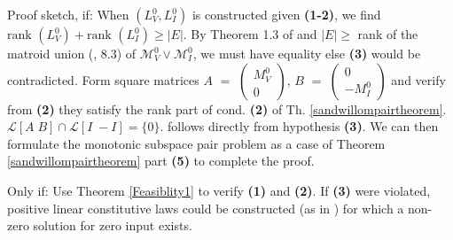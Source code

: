 \documentclass{article}
\newcommand{\hmat}[2]{[#1\;#2]}
\begin{document}
Proof sketch, if:  When $(L_V^0,L_I^0)$ is constructed given
\textbf{(1-2)}, we find $\mbox{rank\ }(L_V^0)+\mbox{rank\ }(L_I^0)\geq|E|$. By
Theorem 1.3 of \cite{sdcOMP}
and $|E|\geq$ rank of the matroid union 
(\cite{Welsh}, 8.3) of $\mathcal{M}_V^0\vee\mathcal{M}_I^0$,
we must have equality else \textbf{(3)} would be 
contradicted.  
Form square matrices
$A$ $=$ $\left(\begin{array}{c}M_V^0\\ 0\end{array}\right)$,
$B$ $=$ $\left(\begin{array}{c}0\\ -M_I^0\end{array}\right)$ and 
verify from \textbf{(2)} they satisfy the rank part of cond. \textbf{(2)} of
Th. \ref{sandwillompairtheorem}. 
${\mathcal L}\hmat{A}{B} \cap {\mathcal L}\hmat{I}{-I}=\{0\}.$
follows directly from hypothesis \textbf{(3)}.  We can then
formulate the monotonic 
subspace pair problem as a case of 
Theorem \ref{sandwillompairtheorem} part \textbf{(5)} to complete the proof.

Only if:  Use Theorem \ref{Feasiblity1} to verify \textbf{(1)} and 
\textbf{(2)}.  
If \textbf{(3)} were violated,
positive linear constitutive laws could be constructed
(as in \cite{HaslerNeirynck,SWExistancePf}) for which 
a non-zero solution for zero input exists.
\end{document}
